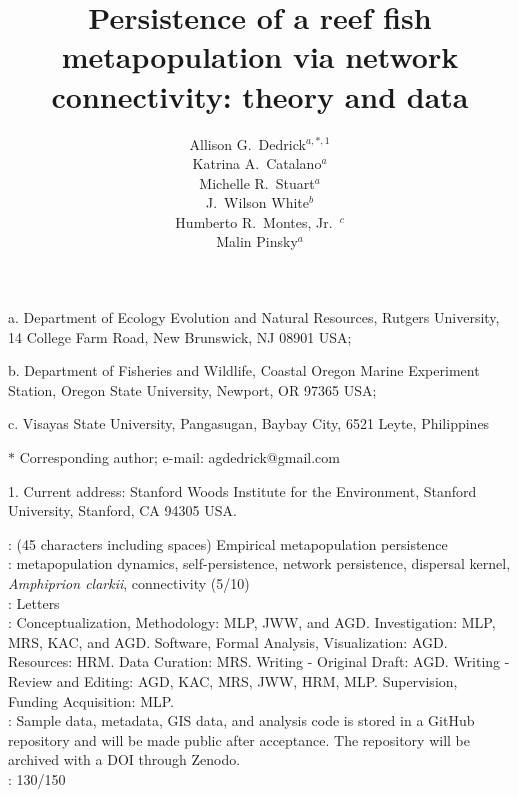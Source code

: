 \documentclass[12pt, oneside]{article}   	%
\author{}
\author{Allison G.\ Dedrick$^{a, \ast, 1}$ \\
Katrina A.\ Catalano$^a$ \\
Michelle R.\ Stuart$^a$ \\
J.\ Wilson White$^b$ \\
Humberto R.\ Montes, Jr.\ $^c$ \\
Malin Pinsky$^a$}
\title{Persistence of a reef fish metapopulation via network connectivity: theory and data}
\date{}
\begin{document}
\renewcommand{\topfraction}{0.95}
\maketitle{}

\noindent{} a. Department of Ecology Evolution and Natural Resources, Rutgers University, 14 College Farm Road, New Brunswick, NJ 08901 USA;

\noindent{} b. Department of Fisheries and Wildlife, Coastal Oregon Marine Experiment Station, Oregon State University, Newport, OR 97365 USA;

\noindent{} c. Visayas State University, Pangasugan, Baybay City, 6521 Leyte, Philippines

\noindent{} $\ast$ Corresponding author; e-mail: agdedrick@gmail.com

\noindent{} 1. Current address: Stanford Woods Institute for the Environment, Stanford University, Stanford, CA 94305 USA.


: (45 characters including spaces) Empirical metapopulation persistence \\

: metapopulation dynamics, self-persistence, network persistence, dispersal kernel, \textit{Amphiprion clarkii}, connectivity (5/10) \\ 

: Letters \\ 

: Conceptualization, Methodology: MLP, JWW, and AGD. Investigation: MLP, MRS, KAC, and AGD. Software, Formal Analysis, Visualization: AGD. Resources: HRM. Data Curation: MRS. Writing - Original Draft: AGD. Writing - Review and Editing: AGD, KAC, MRS, JWW, HRM, MLP. Supervision, Funding Acquisition: MLP.  \\

: Sample data, metadata, GIS data, and analysis code is stored in a GitHub repository and will be made public after acceptance. The repository will be archived with a DOI through Zenodo. \\

: 130/150\\ 
\end{document}
